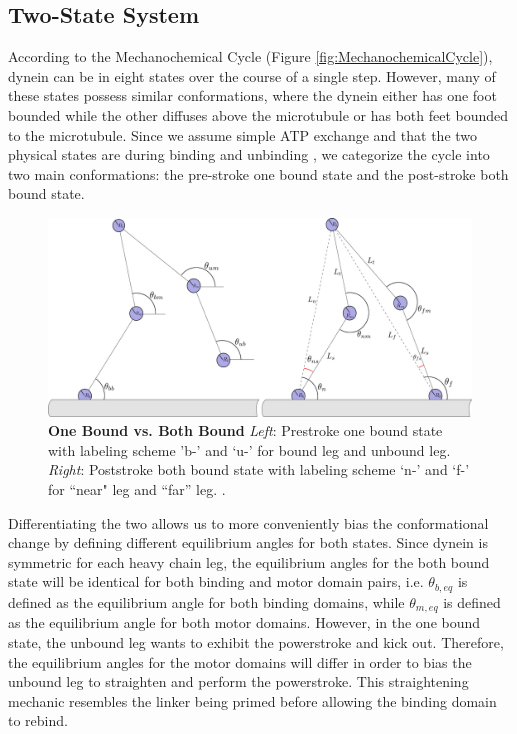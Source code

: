 \subsection{Two-State System}
According to the Mechanochemical Cycle (Figure \ref{fig:MechanochemicalCycle}), dynein can be in eight states over the course of a single step. However, many of these states possess similar conformations, where the dynein either has one foot bounded while the other diffuses above the microtubule or has both feet bounded to the microtubule. Since we assume simple ATP exchange and that the two physical states are during binding and unbinding \cite{}, we categorize the cycle into two main conformations: the pre-stroke one bound state and the post-stroke both bound state.

\begin{figure}[H]
	\centering
	\includegraphics[width=0.9\columnwidth]{Figures/OB_vs_BB.PNG}
	\caption[One Bound vs. Both Bound]{\textbf{One Bound vs. Both Bound} \textit{Left}: Prestroke one bound state with labeling scheme 'b-’ and ‘u-’ for bound leg and unbound leg. \textit{Right}: Poststroke both bound state with labeling scheme ‘n-’ and ‘f-’ for ``near" leg and ``far'' leg. \cite{Capek2017}.}
	\label{fig:OBvsBB}
\end{figure}

Differentiating the two allows us to more conveniently bias the conformational change by defining different equilibrium angles for both states. Since dynein is symmetric for each heavy chain leg, the equilibrium angles for the both bound state will be identical for both binding and motor domain pairs, i.e. $\theta_{b,eq}$ is defined as the equilibrium angle for both binding domains, while $\theta_{m,eq}$ is defined as the equilibrium angle for both motor domains. However, in the one bound state, the unbound leg wants to exhibit the powerstroke and kick out. Therefore, the equilibrium angles for the motor domains will differ in order to bias the unbound leg to straighten and perform the powerstroke. This straightening mechanic resembles the linker being primed before allowing the binding domain to rebind.


